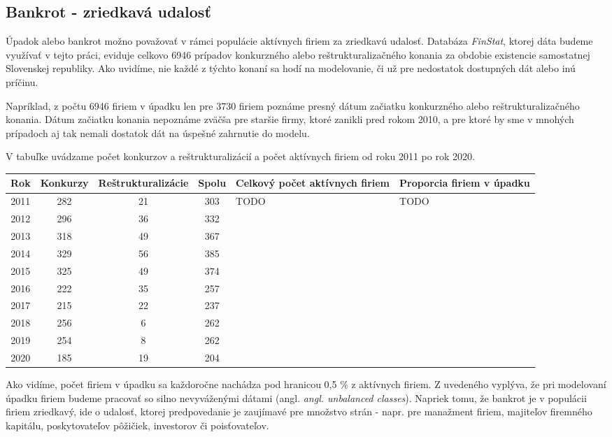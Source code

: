 \subsection{Bankrot - zriedkavá udalosť}

Úpadok alebo bankrot možno považovať v rámci populácie aktívnych firiem za zriedkavú udalosť.
Databáza \emph{FinStat}, ktorej dáta budeme využívať v tejto práci, eviduje celkovo 6946 prípadov konkurzného alebo reštrukturalizačného konania za obdobie existencie samostatnej Slovenskej republiky.
Ako uvidíme, nie každé z týchto konaní sa hodí na modelovanie, či už pre nedostatok dostupných dát alebo inú príčinu.

Napríklad, z počtu 6946 firiem v úpadku len pre 3730 firiem poznáme presný dátum začiatku konkurzného alebo reštrukturalizačného konania.
Dátum začiatku konania nepoznáme zväčša pre staršie firmy, ktoré zanikli pred rokom 2010, a pre ktoré by sme v mnohých prípadoch aj tak nemali dostatok dát na úspešné zahrnutie do modelu.

V tabuľke uvádzame počet konkurzov a reštrukturalizácií a počet aktívnych firiem od roku 2011 po rok 2020.

\begin{center}
    \begin{tabular}{ |c|c|c|c|p{3cm}|p{3cm}| }
        \hline
        Rok & Konkurzy & Reštrukturalizácie & Spolu & Celkový počet aktívnych firiem & Proporcia firiem v úpadku \\
        \hline
        2011 & 282 & 21 & 303 & TODO & TODO \\
        \hline
        2012 & 296 & 36 & 332 & & \\
        \hline
        2013 & 318 & 49 & 367 & & \\
        \hline
        2014 & 329 & 56 & 385 & & \\
        \hline
        2015 & 325 & 49 & 374 & & \\
        \hline
        2016 & 222 & 35 & 257 & & \\
        \hline
        2017 & 215 & 22 & 237 & & \\
        \hline
        2018 & 256 & 6 & 262 & & \\
        \hline
        2019 & 254 & 8 & 262 & & \\
        \hline
        2020 & 185 & 19 & 204 & & \\
        \hline
    \end{tabular}
\end{center}
\bigskip

Ako vidíme, počet firiem v úpadku sa každoročne nachádza pod hranicou 0,5 \% z aktívnych firiem.
Z uvedeného vyplýva, že pri modelovaní úpadku firiem budeme pracovať so silno nevyváženými dátami (angl. \emph{angl. unbalanced classes}).
Napriek tomu, že bankrot je v populácii firiem zriedkavý, ide o udalosť, ktorej predpovedanie je zaujímavé pre množstvo strán -
napr. pre manažment firiem, majiteľov firemného kapitálu, poskytovateľov pôžičiek, investorov či poisťovateľov.